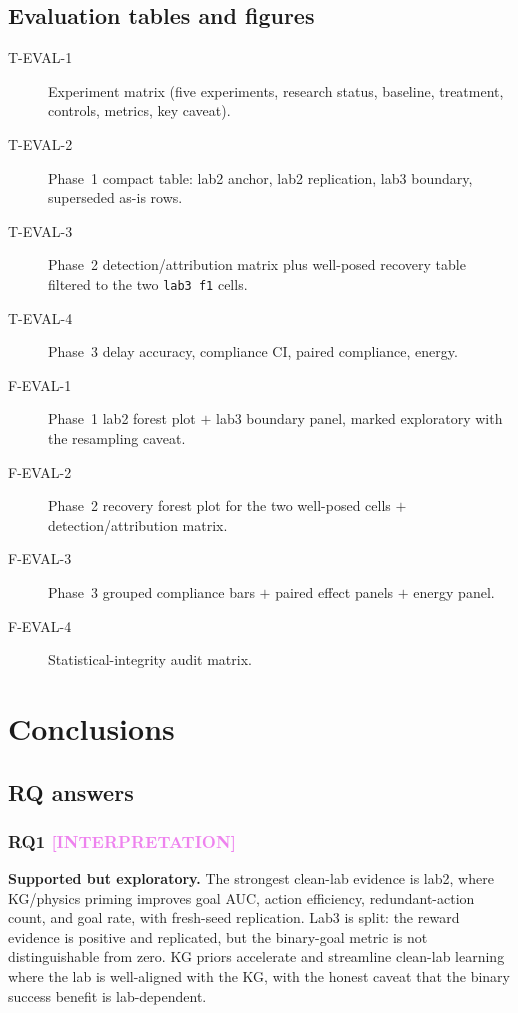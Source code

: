 \documentclass[12pt, a4paper, oneside]{memoir}
\newcommand{\evInterp}{\textcolor{violet}{[INTERPRETATION]}}
\begin{document}
\section{Evaluation tables and figures}
\label{sec:eval-figures}

\begin{description}
  \item[T-EVAL-1] Experiment matrix (five experiments, research status,
        baseline, treatment, controls, metrics, key caveat).
  \item[T-EVAL-2] Phase~1 compact table: lab2 anchor, lab2 replication, lab3
        boundary, superseded as-is rows.
  \item[T-EVAL-3] Phase~2 detection/attribution matrix plus well-posed
        recovery table filtered to the two \texttt{lab3~f1} cells.
  \item[T-EVAL-4] Phase~3 delay accuracy, compliance CI, paired compliance,
        energy.
  \item[F-EVAL-1] Phase~1 lab2 forest plot $+$ lab3 boundary panel, marked
        exploratory with the resampling caveat.
  \item[F-EVAL-2] Phase~2 recovery forest plot for the two well-posed cells
        $+$ detection/attribution matrix.
  \item[F-EVAL-3] Phase~3 grouped compliance bars $+$ paired effect panels
        $+$ energy panel.
  \item[F-EVAL-4] Statistical-integrity audit matrix.
\end{description}

\chapter{Conclusions}
\label{ch:conclusions}

\section{RQ answers}
\label{sec:conc-rqs}

\subsection{RQ1 \evInterp}

\textbf{Supported but exploratory.}  The strongest clean-lab evidence is
lab2, where KG/physics priming improves goal AUC, action efficiency,
redundant-action count, and goal rate, with fresh-seed replication.  Lab3 is
split: the reward evidence is positive and replicated, but the binary-goal
metric is not distinguishable from zero.  KG priors accelerate and
streamline clean-lab learning where the lab is well-aligned with the KG,
with the honest caveat that the binary success benefit is lab-dependent.
\end{document}
